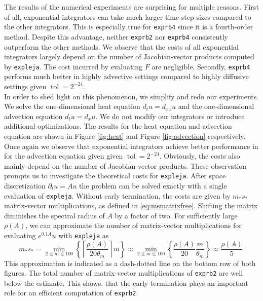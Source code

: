 \documentclass{scrartcl}
\begin{document}
The results of the numerical experiments are surprising for multiple reasons. First of all, exponential integrators can take much larger time step sizes compared to the other integrators. This is especially true for \texttt{exprb4} since it is a fourth-order method. Despite this advantage, neither \texttt{exprb2} nor \texttt{exprb4} consistently outperform the other methods. We observe that the costs of all exponential integrators largely depend on the number of Jacobian-vector products computed by \texttt{expleja}. The cost incurred by evaluating $F$ are negligible. Secondly, \texttt{exprb4} performs much better in highly advective settings compared to highly diffusive settings given $\operatorname{tol} = 2^{-24}$. \\
In order to shed light on this phenomenon, we simplify and redo our experiments. We solve the one-dimensional heat equation $d_tu = d_{xx}u$ and the one-dimensional advection equation $d_tu = d_{x}u$. We do not modify our integrators or introduce additional optimizations. The results for the heat equation and advection equation are shown in Figure \ref{fig:heat} and Figure \ref{fig:advection} respectively. Once again we observe that exponential integrators achieve better performance in for the advection equation given given $\operatorname{tol} = 2^{-24}$. Obviously, the costs also mainly depend on the number of Jacobian-vector products. These observation prompts us to investigate the theoretical costs for \texttt{expleja}.
After space discretization $\partial_{t}u = Au$ the problem can be solved exactly with a single evaluation of \texttt{expleja}. Without early termination, the costs are given by $m_* s_*$ matrix-vector multiplications, as defined in \ref{eq:msmatrixfree}. Shifting the matrix diminishes the spectral radius of $A$ by a factor of two. For sufficiently large $\rho (A)$, we can approximate the number of matrix-vector multiplications for evaluating $e^{0.1A}u$ with \texttt{expleja} as
\[
m_*s_* = \underset{2\le m\le 100}{\min}  \left\{{\left\lceil{\frac{\rho(A)}{20\theta_m}}\right\rceil}m\right\}
\approx
\underset{2\le m\le 100}{\min}  \left\{\frac{\rho(A)}{20}\frac{m}{\theta_m}\right\}
\approx \frac{\rho(A)}{5}.
\]
This approximation is indicated as a dash-dotted line on the bottom row of both figures. The total number of matrix-vector multiplications of \texttt{exprb2} are well below the estimate. This shows, that the early termination plays an important role for an efficient computation of \texttt{exprb2}.
\end{document}
